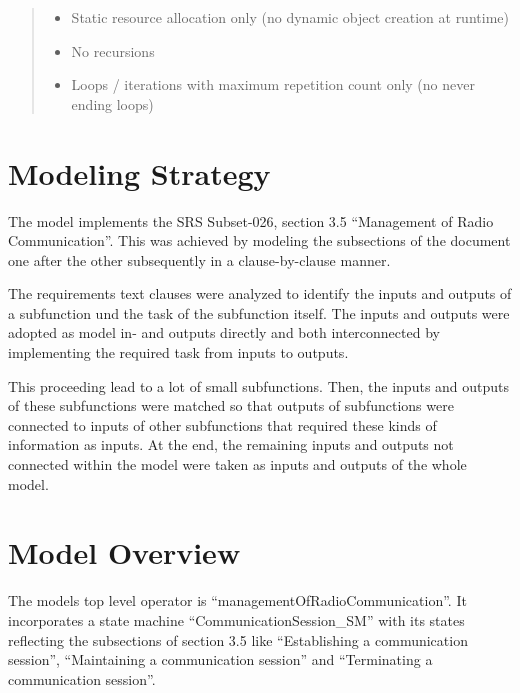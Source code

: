 \documentclass{template/openetcs_article}
\begin{document}
\begin{quote}
\begin{itemize}
	\item Static resource allocation only (no dynamic object creation at runtime)
	\item No recursions
	\item Loops / iterations with maximum repetition count only (no never ending loops)
\end{itemize}
\end{quote}
  

\newpage

\section{Modeling Strategy}
\label{sec:modeling-strategy}

The model implements the SRS Subset-026, section 3.5 "`Management of Radio Communication"'. 
This was achieved by modeling the subsections of the document one after the other subsequently in a clause-by-clause manner. 

The requirements text clauses were analyzed to identify the inputs and outputs of a subfunction und the task of the subfunction itself. The inputs and outputs were adopted as model in- and outputs directly and both interconnected by implementing the required task from inputs to outputs. 

This proceeding lead to a lot of small subfunctions. Then, the inputs and outputs of these subfunctions were matched so that outputs of subfunctions were connected to inputs of other subfunctions that required these kinds of information as inputs. 
At the end, the remaining inputs and outputs not connected within the model were taken as inputs and outputs of the whole model. 

\section{Model Overview}
\label{sec:model-overview}

The models top level operator is "`managementOfRadioCommunication"'. It incorporates a state machine "`CommunicationSession\_SM"' with its states reflecting the subsections of section 3.5 like "`Establishing a communication session"', "`Maintaining a communication session"' and "`Terminating a communication session"'.
\end{document}
